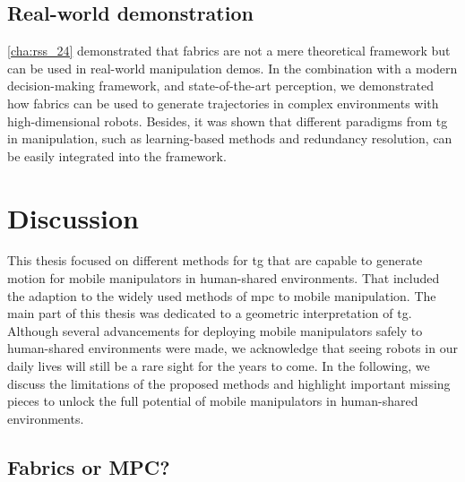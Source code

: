 \subsection{Real-world demonstration}
\label{sec:conclusion_real_world}

\cref{cha:rss_24} demonstrated that \ac{fabrics} are not a mere theoretical
framework but can be used in real-world manipulation demos. In the combination
with a modern decision-making framework, and state-of-the-art perception, 
we demonstrated how \ac{fabrics} can be used to generate trajectories in complex
environments with high-dimensional robots. Besides, it was shown that different
paradigms from \ac{tg} in manipulation, such as learning-based methods and
redundancy resolution, can be easily integrated into the framework.

\section{Discussion}
\label{sec:discussion}

This thesis focused on different methods for \ac{tg} that
are capable to generate motion for mobile manipulators in
human-shared environments. That included the adaption to the
widely used methods of \ac{mpc} to mobile manipulation. The
main part of this thesis was dedicated to a geometric
interpretation of \ac{tg}. Although several advancements for
deploying mobile manipulators safely to human-shared
environments were made, we acknowledge that seeing robots in
our daily lives will still be a rare sight for the years to
come. In the following, we discuss the limitations of the
proposed methods and highlight important missing pieces to
unlock the full potential of mobile manipulators in
human-shared environments.

\subsection{Fabrics or MPC?}
\label{sec:discussion_fabrics_or_mpc}


